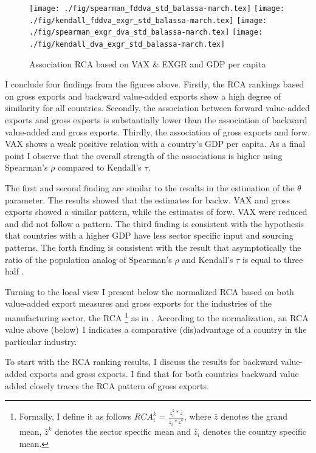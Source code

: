 \begin{figure}[H]
\caption{Association RCA based on VAX \& EXGR and GDP per capita }
\centering
\texttt{[image: ./fig/spearman\_fddva\_std\_balassa-march.tex]}
\texttt{[image: ./fig/kendall\_fddva\_exgr\_std\_balassa-march.tex]}
\texttt{[image: ./fig/spearman\_exgr\_dva\_std\_balassa-march.tex]}
\texttt{[image: ./fig/kendall\_dva\_exgr\_std\_balassa-march.tex]}
\end{figure}
I conclude four findings from the figures above.
Firstly, the RCA rankings based on gross exports and backward value-added exports show a high degree of similarity for all countries.
Secondly, the association between forward value-added exports and gross exports is substantially lower than the association of backward value-added and gross exports.
Thirdly,  the association of gross exports and forw. VAX shows a weak positive relation with a country's GDP per capita.
As a final point I observe that the overall strength of the associations is higher using  Spearman's $\rho$ compared to Kendall's $\tau$. \par
The first and second finding are similar to the results in the estimation of the $\theta$ parameter.
The results showed that the estimates for backw. VAX and gross exports showed a similar pattern, while the estimates of forw. VAX were reduced and did not follow a pattern.
The third finding is consistent with the hypothesis that countries with a higher GDP have less sector specific input and sourcing patterns.
The forth finding is consistent with the result that asymptotically the ratio of the population analog of Spearman's $\rho$ and Kendall's $\tau$ is equal to three half \parencite{fredricks2007}. \par
Turning to the local view  I present below the normalized RCA based on both value-added export measures and gross exports for the industries of the manufacturing sector.
the RCA \footnote{ Formally, I define it as follows $RCA_{i}^{k}=\frac{ z^k_i * \bar{z} }{\bar{z}_i * \bar{z}^k}$, where $\bar{z}$ denotes the grand mean, $\bar{z}^k$ denotes the sector specific mean and $\bar{z}_i$ denotes the country specific mean.} as in \textcite{leromain2014}.
According to the normalization, an RCA  value above (below) 1 indicates a comparative (dis)advantage of a country in the particular industry.
 \par
To start with the RCA ranking results, I discuss the results for backward value-added exports and gross exports.
I find that for both countries backward value added closely traces the RCA pattern of gross exports.

